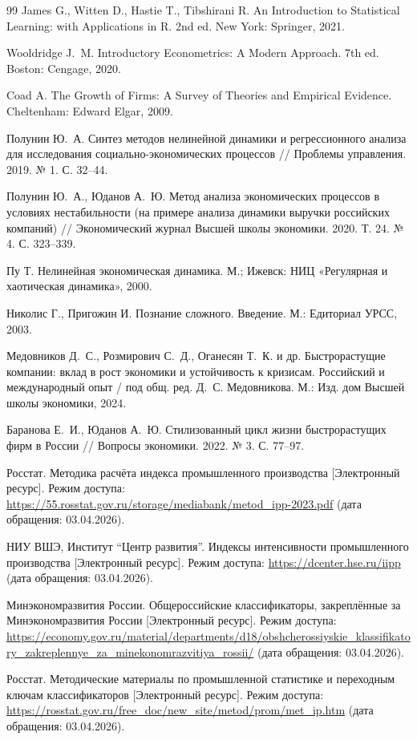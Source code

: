 \begin{thebibliography}{99}
James G., Witten D., Hastie T., Tibshirani R. An Introduction to Statistical Learning: with Applications in R. 2nd ed. New York: Springer, 2021.

Wooldridge J.~M. Introductory Econometrics: A Modern Approach. 7th ed. Boston: Cengage, 2020.

Coad A. The Growth of Firms: A Survey of Theories and Empirical Evidence. Cheltenham: Edward Elgar, 2009.

Полунин Ю.~А. Синтез методов нелинейной динамики и регрессионного анализа для исследования социально-экономических процессов // Проблемы управления. 2019. № 1. С. 32--44.

Полунин Ю.~А., Юданов А.~Ю. Метод анализа экономических процессов в условиях нестабильности (на примере анализа динамики выручки российских компаний) // Экономический журнал Высшей школы экономики. 2020. Т. 24. № 4. С. 323--339.

Пу Т. Нелинейная экономическая динамика. М.; Ижевск: НИЦ «Регулярная и хаотическая динамика», 2000.

Николис Г., Пригожин И. Познание сложного. Введение. М.: Едиториал УРСС, 2003.

Медовников Д.~С., Розмирович С.~Д., Оганесян Т.~К. и др. Быстрорастущие компании: вклад в рост экономики и устойчивость к кризисам. Российский и международный опыт / под общ. ред. Д.~С. Медовникова. М.: Изд. дом Высшей школы экономики, 2024.

Баранова Е.~И., Юданов А.~Ю. Стилизованный цикл жизни быстрорастущих фирм в России // Вопросы экономики. 2022. № 3. С. 77--97.

Росстат. Методика расчёта индекса промышленного производства [Электронный ресурс]. Режим доступа: \url{https://55.rosstat.gov.ru/storage/mediabank/metod_ipp-2023.pdf} (дата обращения: 03.04.2026).

НИУ ВШЭ, Институт ``Центр развития''. Индексы интенсивности промышленного производства [Электронный ресурс]. Режим доступа: \url{https://dcenter.hse.ru/iipp} (дата обращения: 03.04.2026).

Минэкономразвития России. Общероссийские классификаторы, закреплённые за Минэкономразвития России [Электронный ресурс]. Режим доступа: \url{https://economy.gov.ru/material/departments/d18/obshcherossiyskie_klassifikatory_zakreplennye_za_minekonomrazvitiya_rossii/} (дата обращения: 03.04.2026).

Росстат. Методические материалы по промышленной статистике и переходным ключам классификаторов [Электронный ресурс]. Режим доступа: \url{https://rosstat.gov.ru/free_doc/new_site/metod/prom/met_ip.htm} (дата обращения: 03.04.2026).

\end{thebibliography}
